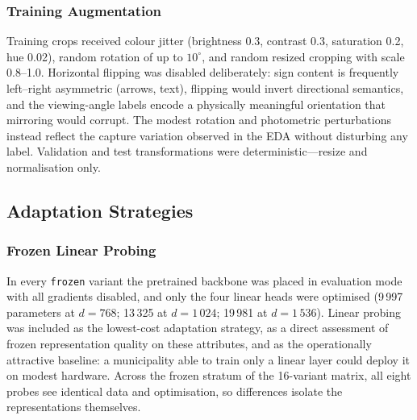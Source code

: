 \subsubsection{Training Augmentation}

Training crops received colour jitter (brightness 0.3, contrast 0.3, saturation 0.2, hue 0.02), random rotation of up to $10^\circ$, and random resized cropping with scale 0.8--1.0. Horizontal flipping was disabled deliberately: sign content is frequently left--right asymmetric (arrows, text), flipping would invert directional semantics, and the viewing-angle labels encode a physically meaningful orientation that mirroring would corrupt. The modest rotation and photometric perturbations instead reflect the capture variation observed in the EDA without disturbing any label. Validation and test transformations were deterministic---resize and normalisation only.

\subsection{Adaptation Strategies}

\subsubsection{Frozen Linear Probing}
In every \texttt{frozen} variant the pretrained backbone was placed in evaluation mode with all gradients disabled, and only the four linear heads were optimised (9\,997 parameters at $d{=}768$; 13\,325 at $d{=}1\,024$; 19\,981 at $d{=}1\,536$). Linear probing was included as the lowest-cost adaptation strategy, as a direct assessment of frozen representation quality on these attributes, and as the operationally attractive baseline: a municipality able to train only a linear layer could deploy it on modest hardware. Across the frozen stratum of the 16-variant matrix, all eight probes see identical data and optimisation, so differences isolate the representations themselves.

